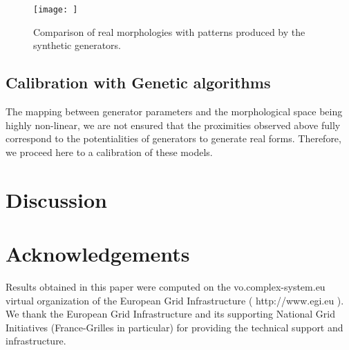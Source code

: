\documentclass[letterpaper]{article}
\begin{document}
\begin{figure}
    \centering
    \texttt{[image: ]}
    \caption{Comparison of real morphologies with patterns produced by the synthetic generators.}
    \label{fig:lhs}
\end{figure}


\subsection{Calibration with Genetic algorithms}

The mapping between generator parameters and the morphological space being highly non-linear, we are not ensured that the proximities observed above fully correspond to the potentialities of generators to generate real forms. Therefore, we proceed here to a calibration of these models.



\section{Discussion}







\section{Acknowledgements}

Results obtained in this paper were computed on the vo.complex-system.eu virtual organization of the European Grid Infrastructure ( http://www.egi.eu ). We thank the European Grid Infrastructure and its supporting National Grid Initiatives (France-Grilles in particular) for providing the technical support and infrastructure.

\footnotesize

\end{document}

